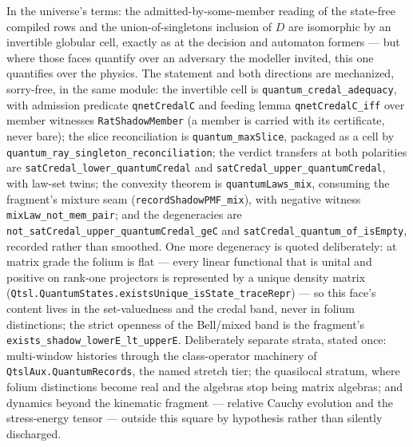 In the universe's terms: the admitted-by-some-member reading of the
state-free compiled rows and the union-of-singletons inclusion of
$D$ are isomorphic by an invertible globular cell, exactly as at the
decision and automaton formers --- but where those faces quantify
over an adversary the modeller invited, this one quantifies over the
physics. The statement and both directions are mechanized,
sorry-free, in the same module: the invertible cell is
\texttt{quantum\_credal\_adequacy}, with admission predicate
\texttt{qnetCredalC} and feeding lemma \texttt{qnetCredalC\_iff}
over member witnesses \texttt{RatShadowMember} (a member is carried
with its certificate, never bare); the slice reconciliation is
\texttt{quantum\_maxSlice}, packaged as a cell by
\texttt{quantum\_ray\_singleton\_reconciliation}; the verdict
transfers at both polarities are
\texttt{satCredal\_lower\_quantumCredal} and
\texttt{satCredal\_upper\_quantumCredal}, with law-set twins; the
convexity theorem is \texttt{quantumLaws\_mix}, consuming the
fragment's mixture seam (\texttt{recordShadowPMF\_mix}), with
negative witness \texttt{mixLaw\_not\_mem\_pair}; and the
degeneracies are
\texttt{not\_satCredal\_upper\_quantumCredal\_geC} and
\texttt{satCredal\_quantum\_of\_isEmpty}, recorded rather than
smoothed. One more degeneracy is quoted deliberately: at matrix
grade the folium is flat --- every linear functional that is unital
and positive on rank-one projectors is represented by a unique
density matrix
(\texttt{Qtsl.QuantumStates.existsUnique\_isState\_traceRepr}) ---
so this face's content lives in the set-valuedness and the credal
band, never in folium distinctions; the strict openness of the
Bell/mixed band is the fragment's
\texttt{exists\_shadow\_lowerE\_lt\_upperE}. Deliberately separate
strata, stated once: multi-window histories through the
class-operator machinery of \texttt{QtslAux.QuantumRecords}, the
named stretch tier; the quasilocal stratum, where folium
distinctions become real and the algebras stop being matrix
algebras; and dynamics beyond the kinematic fragment --- relative
Cauchy evolution and the stress-energy tensor \cite{fewster15} ---
outside this square by hypothesis rather than silently discharged.

